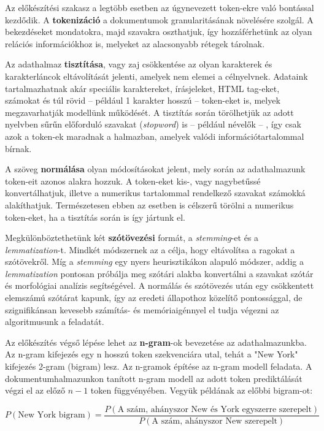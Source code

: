Az előkészítési szakasz a legtöbb esetben az úgynevezett token-ekre való bontással kezdődik. A \textbf{tokenizáció} a dokumentumok granularitásának növelésére szolgál. A bekezdéseket mondatokra, majd szavakra oszthatjuk, így hozzáférhetünk az olyan relációs információkhoz is, melyeket az alacsonyabb rétegek tárolnak.

Az adathalmaz \textbf{tisztítása}, vagy zaj csökkentése az olyan karakterek és karakterláncok eltávolítását jelenti, amelyek nem elemei a célnyelvnek. Adataink tartalmazhatnak akár speciális karaktereket, írásjeleket, HTML tag-eket, számokat és túl rövid – például 1 karakter hosszú – token-eket is, melyek megzavarhatják modellünk működését. A tisztítás során törölhetjük az adott nyelvben sűrűn előforduló szavakat (\textit{stopword}) is – például névelők – , így csak azok a token-ek maradnak a halmazban, amelyek valódi információtartalommal bírnak.

A szöveg \textbf{normálása} olyan módosításokat jelent, mely során az adathalmazunk token-eit azonos alakra hozzuk. A token-eket kis-, vagy nagybetűssé konvertálhatjuk, illetve a numerikus tartalommal rendelkező szavakat számokká alakíthatjuk. Természetesen ebben az esetben is célszerű törölni a numerikus token-eket, ha a tisztítás során is így jártunk el.

Megkülönböztethetünk két \textbf{szótövezési} formát, a \textit{stemming}-et és a \textit{lemmatization}-t. Mindkét módszernek az a célja, hogy eltávolítsa a ragokat a szótövekről. Míg a \textit{stemming} egy nyers heurisztikákon alapuló módszer, addig a \textit{lemmatization} pontosan próbálja meg szótári alakba konvertálni a szavakat szótár és morfológiai analízis segítségével. A normálás és szótövezés után egy csökkentett elemszámú szótárat kapunk, így az eredeti állapothoz közelítő pontossággal, de szignifikánsan kevesebb számítás- és memóriaigénnyel el tudja végezni az algoritmusunk a feladatát.

Az előkészítés végső lépése lehet az \textbf{n-gram}-ok bevezetése az adathalmazunkba. Az n-gram kifejezés egy n hosszú token szekvenciára utal, tehát a "New York" kifejezés 2-gram (bigram) lesz. Az n-gramok építése az n-gram modell feladata. A dokumentumhalmazunkon tanított n-gram modell az adott token prediktálását végzi el az előző $n-1$ token függvényében. Vegyük példának az előbbi bigram-ot:

\begin{equation}
\label{eq:n-grams}
P(\text{New York bigram}) = \frac{P(\text{A szám, ahányszor New és York egyszerre szerepelt})}{P(\text{A szám, ahányszor New szerepelt})}
\end{equation}

